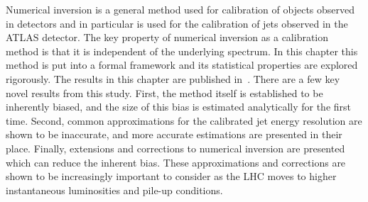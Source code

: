 Numerical inversion is a general method used for calibration of objects observed in detectors and in particular is used for the calibration of jets observed in the ATLAS detector.
The key property of numerical inversion as a calibration method is that it is independent of the underlying spectrum.
In this chapter this method is put into a formal framework and its statistical properties are explored rigorously.
The results in this chapter are published in~\cite{Cukierman:2016dkb}.
There are a few key novel results from this study.
First, the method itself is established to be inherently biased, and the size of this bias is estimated analytically for the first time.
Second, common approximations for the calibrated jet energy resolution are shown to be inaccurate, and more accurate estimations are presented in their place. 
Finally, extensions and corrections to numerical inversion are presented which can reduce the inherent bias.
These approximations and corrections are shown to be increasingly important to consider as the LHC moves to higher instantaneous luminosities and pile-up conditions.



